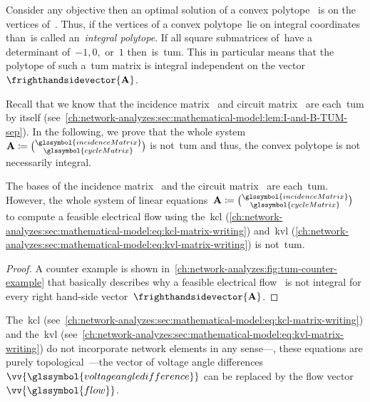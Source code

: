 Consider any objective then an optimal solution of a convex polytope~\polyhedron
is on the vertices of~\polyhedron. Thus, if the vertices of a convex
polytope~\polyhedron lie on integral coordinates than~\polyhedron is called
an~\emph{integral polytope}. If all square submatrices of~\constraintmatrix have
a determinant of~$-1, 0,$ or~$1$ then~\constraintmatrix is~\gls{tum}. This in
particular means that the polytope of such a~\gls{tum} matrix is integral
independent on the vector~$
    \frighthandsidevector{\constraintmatrix}
$.

Recall that we know that the incidence
matrix~ and circuit matrix~
are each~\gls{tum} by itself
(see~\cref{ch:network-analyzes:sec:mathematical-model:lem:I-and-B-TUM-sep}). In
the following, we prove that the whole system~$
    \constraintmatrix 
    \coloneqq 
    \binom{ 
        \glssymbol{incidenceMatrix} 
    }{ 
        \glssymbol{cycleMatrix} 
    }
$ is not~\gls{tum} and thus, the convex polytope is not necessarily integral.
% 
\begin{lemma}
% 
The bases of the incidence matrix~ and the circuit
matrix~ are each~\gls{tum}. However, the whole system
of linear equations~$
% 
\constraintmatrix 
\coloneqq 
\binom{ 
    \glssymbol{incidenceMatrix} 
}{ 
    \glssymbol{cycleMatrix} 
}
% 
$ to compute a feasible electrical flow using the~\gls{kcl}
(\cref{ch:network-analyzes:sec:mathematical-model:eq:kcl-matrix-writing})
and~\gls{kvl}
(\cref{ch:network-analyzes:sec:mathematical-model:eq:kvl-matrix-writing}) is
not~\gls{tum}.
% 
\label{ch:network-analyzes:sec:mathematical-model:lem:pf-matrix-is-tum}
% 
\end{lemma}
% 
\begin{proof}
    A counter example is shown
    in~\cref{ch:network-analyzes:fig:tum-counter-example} that basically
    describes why a feasible electrical flow~ is not integral
    for every right hand-side vector~$\frighthandsidevector{\constraintmatrix}$.
\end{proof}%

The~\gls{kcl}
(see~\cref{ch:network-analyzes:sec:mathematical-model:eq:kcl-matrix-writing})
and the~\gls{kvl}
(see~\cref{ch:network-analyzes:sec:mathematical-model:eq:kvl-matrix-writing}) do
not incorporate network elements in any sense---\ie, these equations are purely
topological~\parencite[p.127; Section 6-3]{Ses61}---the vector of voltage angle
differences~$\vv{\glssymbol{voltageangledifference}}$ can be replaced by the
flow vector~$\vv{\glssymbol{flow}}$. 

